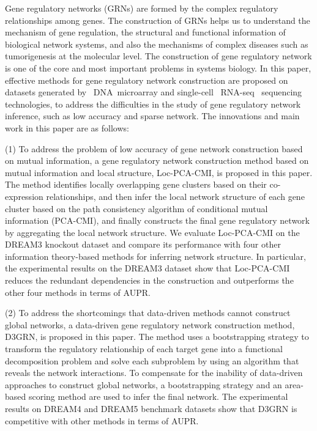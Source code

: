 \begin{abstracten}\setlength{\baselineskip}{20pt}


Gene regulatory networks (GRNs) are formed by the complex regulatory relationships among genes. 
The construction of GRNs helps us to understand the mechanism of gene regulation, the structural and functional information of biological network systems, and also the mechanisms of complex diseases such as tumorigenesis at the molecular level.
The construction of gene regulatory network is one of the core and most important problems in systems biology.
In this paper, effective methods for gene regulatory network construction are proposed on datasets generated by ~DNA~microarray and single-cell ~RNA-seq~ sequencing technologies, 
to address  the difficulties in the study of gene regulatory network inference, such as low accuracy and sparse network.
The innovations and main work in this paper are as follows:

(1) To address the problem of low accuracy of gene network construction based on mutual information, 
a gene regulatory network construction method based on mutual information and local structure, Loc-PCA-CMI, is proposed in this paper. 
The method identifies locally overlapping gene clusters based on their co-expression relationships, and then infer the local network structure of each gene cluster based on the path consistency algorithm of conditional mutual information (PCA-CMI), 
and finally constructs the final gene regulatory network by aggregating the local network structure.
We evaluate Loc-PCA-CMI on the DREAM3 knockout dataset and compare its performance with four other information theory-based methods for inferring network structure.
In particular, the experimental results on the DREAM3 dataset show that Loc-PCA-CMI~ reduces the redundant dependencies 
in the construction  and outperforms the other four  methods in terms of AUPR.

(2) To address the shortcomings that data-driven methods cannot construct global networks, 
a data-driven gene regulatory network construction method, D3GRN, is proposed in this paper. 
The method uses a bootstrapping strategy to transform the regulatory relationship of each target gene into a functional decomposition problem and solve each subproblem by using an algorithm that reveals the network interactions. 
To compensate for the inability of data-driven approaches to construct global networks, 
a bootstrapping strategy and an area-based scoring method are used to infer the final network. 
The experimental results on DREAM4 and DREAM5 benchmark datasets show that D3GRN is competitive with other  methods in terms of AUPR.



\end{abstracten}
